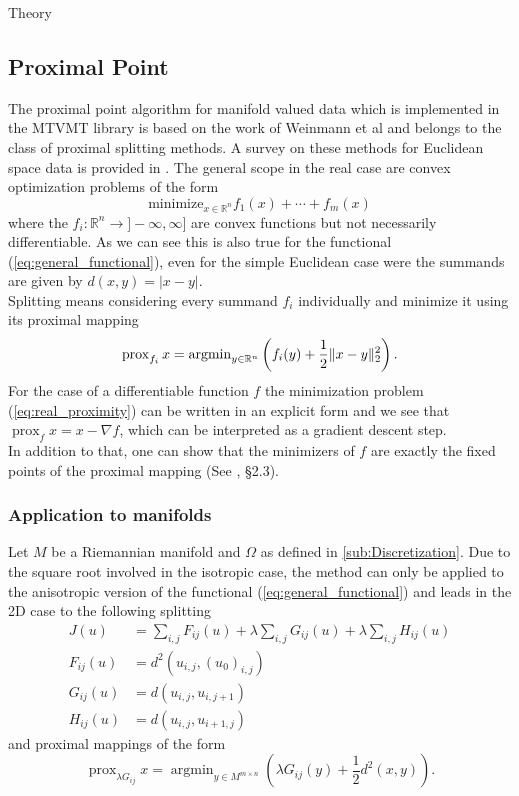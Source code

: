 \begin{chapter}{Theory}
\subsection{Proximal Point} %
\label{sub:ProximalPoint}
The proximal point algorithm for manifold valued data which is implemented in the MTVMT library is based on the work of Weinmann et al\cite{Weinmann} and belongs to the class
of proximal splitting methods. A survey on these methods for Euclidean space data is provided in \cite{CombettesPequet}. The general scope in the real case are convex
optimization problems of the form
\begin{equation}
    \text{minimize}_{x\in \mathbb{R}^n} f_1(x) + \cdots +f_m(x)
\end{equation}
where the $f_i:\mathbb{R}^n\to]-\infty,\infty]$ are convex functions but not necessarily differentiable. As we can see this is also true for the functional (\ref{eq:general_functional}),
even for the simple Euclidean case were the summands are given by $d(x,y)=|x-y|$. \\
Splitting means considering every summand $f_i$ individually and minimize it using its proximal mapping
\begin{equation}
    \label{eq:real_proximity}
    \operatorname{prox}_{f_i}x=\operatorname{argmin}_{y\in\mathbb{R}^n}\left(f_i(y) + \frac{1}{2}\| x-y \|^2_{2} \right).
\end{equation}
For the case of a differentiable function $f$ the minimization problem (\ref{eq:real_proximity}) 
can be written in an explicit form and we see that $\operatorname{prox}_f x = x-\nabla f$, which 
can be interpreted as a gradient descent step.\\
In addition to that, one can show that the minimizers of $f$ are exactly the fixed points of the proximal mapping (See \cite{ParikhBoyd}, \S 2.3).

\subsubsection{Application to manifolds} %
\label{ssub:Application to manifolds}
Let $M$ be a Riemannian manifold and $\Omega$ as defined in \ref{sub:Discretization}. Due to the square root involved in the isotropic case,
the method can only be applied to the anisotropic version of the functional (\ref{eq:general_functional}) and leads in the 2D case to the following splitting
\begin{align}
    J(u)	&= \sum_{i,j}F_{ij}(u)+\lambda\sum_{i,j}G_{ij}(u)+\lambda\sum_{i,j}H_{ij}(u)\\
    F_{ij}(u)	&=  d^{2}(u_{i,j},(u_0)_{i,j})\\
    G_{ij}(u)	&=  d(u_{i,j},u_{i,j+1})\\
    H_{ij}(u)	&=  d(u_{i,j},u_{i+1,j})
\end{align}
and proximal mappings of the form
\begin{equation}
\label{eq:manifold_proximity}
\operatorname{prox}_{\lambda G_{ij}}x=\operatorname{argmin}_{y\in M^{m\times n}}\left(\lambda G_{ij}(y) +\frac{1}{2}d^2(x,y) \right).
\end{equation}


\end{chapter}
